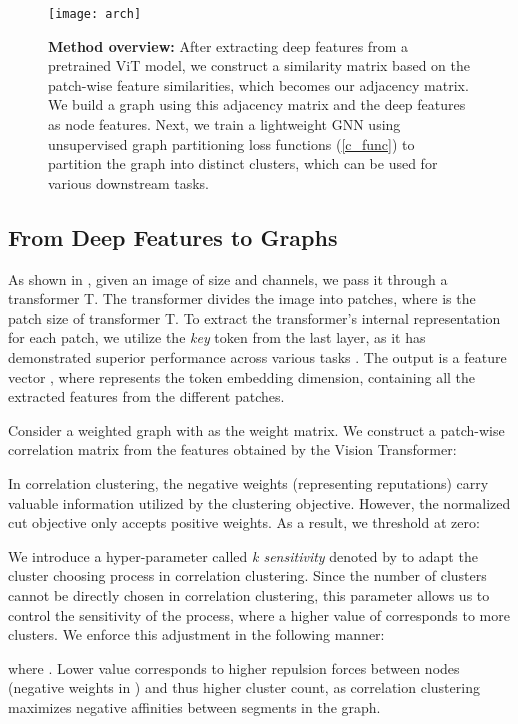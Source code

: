 \documentclass[10pt,twocolumn,letterpaper]{article}
\begin{document}
\begin{figure*}[ht]
\texttt{[image: arch]}
\caption{
\textbf{Method overview:} After extracting deep features from a pretrained ViT model, we construct a similarity matrix based on the patch-wise feature similarities, which becomes our adjacency matrix. We build a graph using this adjacency matrix and the deep features as node features. Next, we train a lightweight GNN using unsupervised graph partitioning loss functions (\cref{c_func}) to partition the graph into  distinct clusters, which can be used for various downstream tasks.
}
\label{fig:arch}
\end{figure*}

\subsection{From Deep Features to Graphs}\label{sec:deep_to}
As shown in , given an image  of size  and  channels, we pass it through a transformer T. 
The transformer divides the image into  patches,
where  is the patch size of transformer T. To extract the transformer's internal representation for each patch, we utilize the \emph{key} token from the last layer, as it has demonstrated superior performance across various tasks \cite{amir2021deep, melas2022deep}. The output is a feature vector , where  represents the token embedding dimension, containing all the extracted features from the different patches.

Consider a weighted graph  with  as the weight matrix. We construct a patch-wise correlation matrix from the features obtained by the Vision Transformer:

In correlation clustering, the negative weights (representing reputations) carry valuable information utilized by the clustering objective. However, the normalized cut objective only accepts positive weights. As a result, we threshold at zero:



We introduce a hyper-parameter called \emph{k sensitivity} denoted by  to adapt the cluster choosing process in correlation clustering. Since the number of clusters cannot be directly chosen in correlation clustering, this parameter allows us to control the sensitivity of the process, where a higher value of  corresponds to more clusters. We enforce this adjustment in the following manner:


where . Lower  value corresponds to higher repulsion forces between nodes (negative weights in ) and thus higher cluster count, as correlation clustering maximizes negative affinities between segments in the graph.
\end{document}
